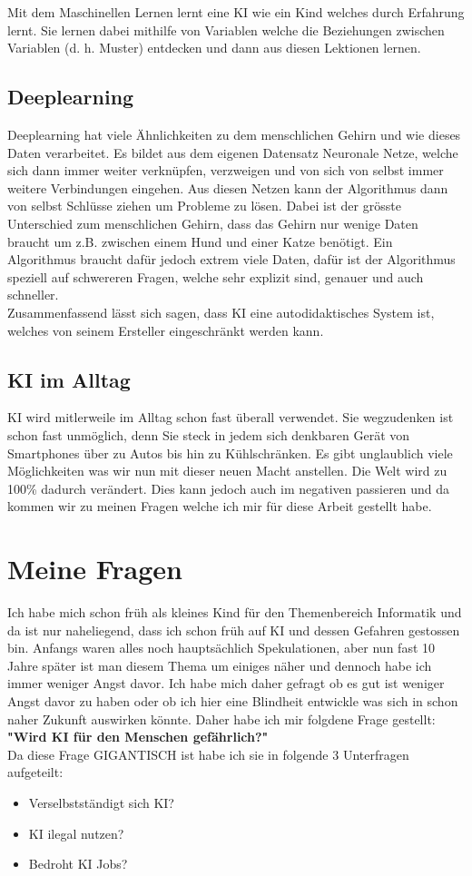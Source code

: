 Mit dem Maschinellen Lernen lernt eine KI wie ein Kind welches durch Erfahrung lernt. Sie lernen dabei mithilfe von Variablen welche die Beziehungen zwischen Variablen (d. h. Muster) entdecken und dann aus diesen Lektionen lernen.

\subsection{Deeplearning}

Deeplearning hat viele Ähnlichkeiten zu dem menschlichen Gehirn und wie dieses Daten verarbeitet.
Es bildet aus dem eigenen Datensatz Neuronale Netze, welche sich dann immer weiter verknüpfen, verzweigen und von sich von selbst immer weitere Verbindungen eingehen. Aus diesen Netzen kann der Algorithmus dann von selbst Schlüsse ziehen um Probleme zu lösen.
Dabei ist der grösste Unterschied zum menschlichen Gehirn, dass das Gehirn nur wenige Daten braucht um z.B. zwischen einem Hund und einer Katze benötigt. Ein Algorithmus braucht dafür jedoch extrem viele Daten,
 dafür ist der Algorithmus speziell auf schwereren Fragen, welche sehr explizit sind, genauer und auch schneller.
\\
Zusammenfassend lässt sich sagen, dass KI eine autodidaktisches System ist, welches von seinem Ersteller eingeschränkt werden kann.  \citep{Was-ist-KI?}

\subsection{KI im Alltag}
KI wird mitlerweile im Alltag schon fast überall verwendet. Sie wegzudenken ist schon fast unmöglich, denn Sie steck in jedem sich denkbaren Gerät von Smartphones über zu Autos bis hin zu Kühlschränken.
Es gibt unglaublich viele Möglichkeiten was wir nun mit dieser neuen Macht anstellen. Die Welt wird zu 100\% dadurch verändert. Dies kann jedoch auch im negativen passieren und da kommen wir zu meinen Fragen welche ich mir für diese Arbeit gestellt habe.


\section{Meine Fragen}
Ich habe mich schon früh als kleines Kind für den Themenbereich Informatik und da ist nur naheliegend, dass ich schon früh auf KI und dessen Gefahren gestossen bin.
Anfangs waren alles noch hauptsächlich Spekulationen, aber nun fast 10 Jahre später ist man diesem Thema um einiges näher und dennoch habe ich immer weniger Angst davor.
Ich habe mich daher gefragt ob es gut ist weniger Angst davor zu haben oder ob ich hier eine Blindheit entwickle was sich in schon naher Zukunft auswirken könnte.
Daher habe ich mir folgdene Frage gestellt: \textbf{"Wird KI für den Menschen gefährlich?"}
\\
Da diese Frage GIGANTISCH ist habe ich sie in folgende 3 Unterfragen aufgeteilt:
\begin{itemize}
    \item Verselbstständigt sich KI?
    \item KI ilegal nutzen?
    \item Bedroht KI Jobs?
\end{itemize}